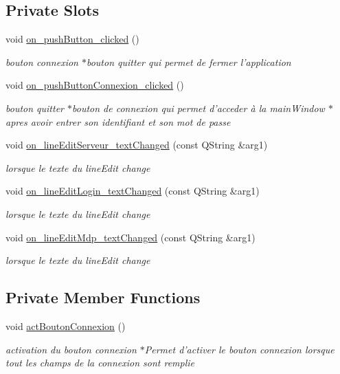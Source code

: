 \subsection*{Private Slots}
\begin{DoxyCompactItemize}
\item 
void \hyperlink{class_accueil_a8d547ac07d671dcab5b5666ea281b355}{on\-\_\-push\-Button\-\_\-clicked} ()
\begin{DoxyCompactList}\small\item\em bouton connexion $\ast$bouton quitter qui permet de fermer l'application \end{DoxyCompactList}\item 
void \hyperlink{class_accueil_a568ba13da62ab6998b3416095192672b}{on\-\_\-push\-Button\-Connexion\-\_\-clicked} ()
\begin{DoxyCompactList}\small\item\em bouton quitter $\ast$bouton de connexion qui permet d'acceder à la main\-Window $\ast$apres avoir entrer son identifiant et son mot de passe \end{DoxyCompactList}\item 
void \hyperlink{class_accueil_aaf5763940627534a3803470dc6c9153e}{on\-\_\-line\-Edit\-Serveur\-\_\-text\-Changed} (const Q\-String \&arg1)
\begin{DoxyCompactList}\small\item\em lorsque le texte du line\-Edit change \end{DoxyCompactList}\item 
void \hyperlink{class_accueil_adbee1c25bc25bcb1bb266a9f583d1b1e}{on\-\_\-line\-Edit\-Login\-\_\-text\-Changed} (const Q\-String \&arg1)
\begin{DoxyCompactList}\small\item\em lorsque le texte du line\-Edit change \end{DoxyCompactList}\item 
void \hyperlink{class_accueil_ab1395f01e2ed26ed042e4be26b1b1bfb}{on\-\_\-line\-Edit\-Mdp\-\_\-text\-Changed} (const Q\-String \&arg1)
\begin{DoxyCompactList}\small\item\em lorsque le texte du line\-Edit change \end{DoxyCompactList}\end{DoxyCompactItemize}
\subsection*{Private Member Functions}
\begin{DoxyCompactItemize}
\item 
void \hyperlink{class_accueil_a618fd9733da9027763cd14006f0475ae}{act\-Bouton\-Connexion} ()
\begin{DoxyCompactList}\small\item\em activation du bouton connexion $\ast$\-Permet d'activer le bouton connexion lorsque tout les champs de la connexion sont remplie \end{DoxyCompactList}\end{DoxyCompactItemize}
